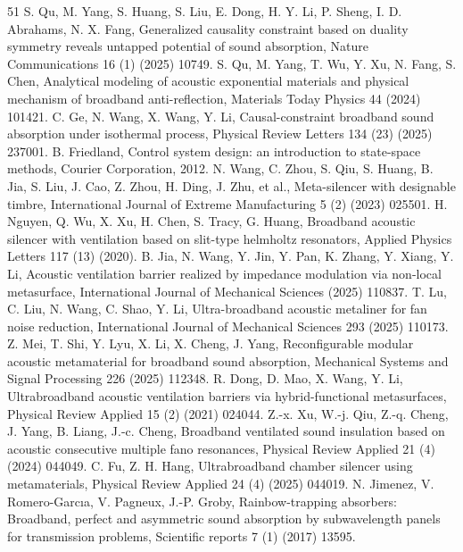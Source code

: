 \documentclass[final,5p,times,twocolumn]{elsarticle}
\begin{document}
\begin{thebibliography}{51}
	 S. Qu, M. Yang, S. Huang, S. Liu, E. Dong, H. Y. Li, P. Sheng, I. D. Abrahams, N. X. Fang, Generalized causality constraint based on duality symmetry reveals untapped potential of sound absorption, Nature Communications 16 (1) (2025) 10749.
	 S. Qu, M. Yang, T. Wu, Y. Xu, N. Fang, S. Chen, Analytical modeling of acoustic exponential materials and physical mechanism of broadband anti-reflection, Materials Today Physics 44 (2024) 101421.
	 C. Ge, N. Wang, X. Wang, Y. Li, Causal-constraint broadband sound absorption under isothermal process, Physical Review Letters 134 (23) (2025) 237001.
	 B. Friedland, Control system design: an introduction to state-space methods, Courier Corporation, 2012.
	 N. Wang, C. Zhou, S. Qiu, S. Huang, B. Jia, S. Liu, J. Cao, Z. Zhou, H. Ding, J. Zhu, et al., Meta-silencer with designable timbre, International Journal of Extreme Manufacturing 5 (2) (2023) 025501.
	 H. Nguyen, Q. Wu, X. Xu, H. Chen, S. Tracy, G. Huang, Broadband acoustic silencer with ventilation based on slit-type helmholtz resonators, Applied Physics Letters 117 (13) (2020).
	 B. Jia, N. Wang, Y. Jin, Y. Pan, K. Zhang, Y. Xiang, Y. Li, Acoustic ventilation barrier realized by impedance modulation via non-local metasurface, International Journal of Mechanical Sciences (2025) 110837.
	 T. Lu, C. Liu, N. Wang, C. Shao, Y. Li, Ultra-broadband acoustic metaliner for fan noise reduction, International Journal of Mechanical Sciences 293 (2025) 110173.
	 Z. Mei, T. Shi, Y. Lyu, X. Li, X. Cheng, J. Yang, Reconfigurable modular acoustic metamaterial for broadband sound absorption, Mechanical Systems and Signal Processing 226 (2025) 112348.
	 R. Dong, D. Mao, X. Wang, Y. Li, Ultrabroadband acoustic ventilation barriers via hybrid-functional metasurfaces, Physical Review Applied 15 (2) (2021) 024044.
	 Z.-x. Xu, W.-j. Qiu, Z.-q. Cheng, J. Yang, B. Liang, J.-c. Cheng, Broadband ventilated sound insulation based on acoustic consecutive multiple fano resonances, Physical Review Applied 21 (4) (2024) 044049.
	 C. Fu, Z. H. Hang, Ultrabroadband chamber silencer using metamaterials, Physical Review Applied 24 (4) (2025) 044019.
	 N. Jimenez, V. Romero-Garcıa, V. Pagneux, J.-P. Groby, Rainbow-trapping absorbers: Broadband, perfect and asymmetric sound absorption by subwavelength panels for transmission problems, Scientific reports 7 (1) (2017) 13595.

\end{thebibliography}
\end{document}
